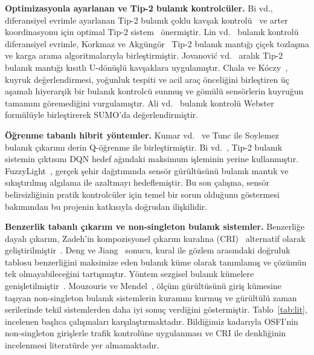 \documentclass[11pt,a4paper]{article}
\theoremstyle{definition}
\begin{document}
\textbf{Optimizasyonla ayarlanan ve Tip-2 bulanık kontrolcüler.} Bi vd., diferansiyel evrimle ayarlanan Tip-2 bulanık çoklu kavşak kontrolü~\cite{bi2014} ve arter koordinasyonu için optimal Tip-2 sistem~\cite{bi2018} önermiştir. Lin vd.~\cite{lin2023} bulanık kontrolü diferansiyel evrimle, Korkmaz ve Akgüngör~\cite{korkmaz2024} Tip-2 bulanık mantığı çiçek tozlaşma ve karga arama algoritmalarıyla birleştirmiştir. Jovanović vd.~\cite{jovanovic2023} aralık Tip-2 bulanık mantığı kısıtlı U-dönüşlü kavşaklara uygulamıştır. Chala ve Kóczy~\cite{chala2024}, kuyruk değerlendirmesi, yoğunluk tespiti ve acil araç önceliğini birleştiren üç aşamalı hiyerarşik bir bulanık kontrolcü sunmuş ve gömülü sensörlerin kuyruğun tamamını göremediğini vurgulamıştır. Ali vd.~\cite{ali2021} bulanık kontrolü Webster formülüyle birleştirerek SUMO'da değerlendirmiştir.

\textbf{Öğrenme tabanlı hibrit yöntemler.} Kumar vd.~\cite{kumar2021} ve Tunc ile Soylemez~\cite{tunc2023} bulanık çıkarımı derin Q-öğrenme ile birleştirmiştir. Bi vd.~\cite{bi2024electronics}, Tip-2 bulanık sistemin çıktısını DQN hedef ağındaki maksimum işleminin yerine kullanmıştır. FuzzyLight~\cite{li2025fuzzylight}, gerçek şehir dağıtımında sensör gürültüsünü bulanık mantık ve sıkıştırılmış algılama ile azaltmayı hedeflemiştir. Bu son çalışma, sensör belirsizliğinin pratik kontrolcüler için temel bir sorun olduğunu göstermesi bakımından bu projenin katkısıyla doğrudan ilişkilidir.

\textbf{Benzerlik tabanlı çıkarım ve non-singleton bulanık sistemler.} Benzerliğe dayalı çıkarım, Zadeh'in kompozisyonel çıkarım kuralına (CRI)~\cite{zadeh1973} alternatif olarak geliştirilmiştir~\cite{wang2008}. Deng ve Jiang~\cite{deng2014osfi} sonucu, kural ile gözlem arasındaki doğruluk tablosu benzerliğini maksimize eden bulanık küme olarak tanımlamış ve çözümün tek olmayabileceğini tartışmıştır. Yöntem sezgisel bulanık kümelere genişletilmiştir~\cite{esmaeili2019}. Mouzouris ve Mendel~\cite{mouzouris1997}, ölçüm gürültüsünü giriş kümesine taşıyan non-singleton bulanık sistemlerin kuramını kurmuş ve gürültülü zaman serilerinde tekil sistemlerden daha iyi sonuç verdiğini göstermiştir. Tablo~\ref{tab:lit}, incelenen başlıca çalışmaları karşılaştırmaktadır. Bildiğimiz kadarıyla OSFI'nin non-singleton girişlerle trafik kontrolüne uygulanması ve CRI ile denkliğinin incelenmesi literatürde yer almamaktadır.
\end{document}
